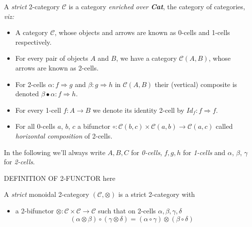 \documentclass[a4paper]{article}
\begin{document}
\begin{definition}  \label{def:strict-two-cat}
A \emph{strict} 2-category $\mathcal{C}$ is a category \emph{enriched over
  \textbf{Cat}}, the category of categories, \emph{viz:}
\begin{itemize}
\item A category $\mathcal{C}$, whose objects and arrows are known as
  0-cells and 1-cells respectively.
\item For every pair of objects $A$ and $B$, we have a
  category $\mathcal{C}(A, B)$, whose arrows are known as 2-cells.
\item For 2-cells $\alpha : f \Rightarrow g$ and $\beta : g
  \Rightarrow h$ in $\mathcal{C}(A,B)$ their (vertical) composite is denoted
  $\beta\bullet\alpha : f \Rightarrow h$.
\item For every 1-cell $f:A\to B$ we denote its identity 2-cell by
  $Id_f:f \Rightarrow f$.
\item For all 0-cells $a$, $b$, $c$ a bifunctor $\circ: \mathcal{C}(b, c)
  \times \mathcal{C}(a, b) \to \mathcal{C}(a, c)$ called \emph{horizontal
    composition} of 2-cells.
\end{itemize}
\end{definition}

\noindent
In the following we'll always write $A, B, C$ for \emph{0-cells}, $f,
g, h$ for \emph{1-cells} and $\alpha$, $\beta$, $\gamma$ for
\emph{2-cells}.

\begin{definition}
  \label{def:two-functor}
  DEFINITION OF 2-FUNCTOR here
\end{definition}


\begin{definition}\label{def:monoidal-two-cat}
A \emph{strict} monoidal 2-category $(\mathcal{C}, \otimes)$ is a strict
2-category with
\begin{itemize}
\item a 2-bifunctor $\otimes: \mathcal{C} \times \mathcal{C} \to \mathcal{C}$
  such that on 2-cells $\alpha, \beta, \gamma, \delta$
\[
(\alpha \otimes \beta) \circ (\gamma \otimes \delta) = (\alpha \circ \gamma)
  \otimes (\beta \circ \delta)
\]
\end{itemize}
\end{definition}
\end{document}
